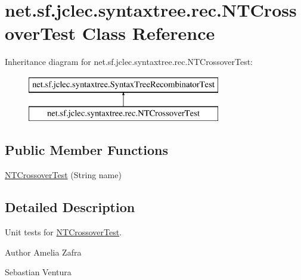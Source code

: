 \hypertarget{classnet_1_1sf_1_1jclec_1_1syntaxtree_1_1rec_1_1_n_t_crossover_test}{\section{net.\-sf.\-jclec.\-syntaxtree.\-rec.\-N\-T\-Crossover\-Test Class Reference}
\label{classnet_1_1sf_1_1jclec_1_1syntaxtree_1_1rec_1_1_n_t_crossover_test}
}
Inheritance diagram for net.\-sf.\-jclec.\-syntaxtree.\-rec.\-N\-T\-Crossover\-Test\-:\begin{figure}[H]
\begin{center}
\leavevmode
\includegraphics[height=2.000000cm]{classnet_1_1sf_1_1jclec_1_1syntaxtree_1_1rec_1_1_n_t_crossover_test}
\end{center}
\end{figure}
\subsection*{Public Member Functions}
\begin{DoxyCompactItemize}
\item 
\hyperlink{classnet_1_1sf_1_1jclec_1_1syntaxtree_1_1rec_1_1_n_t_crossover_test_ab1db0d79a45bce456fb3a65db95493ec}{N\-T\-Crossover\-Test} (String name)
\end{DoxyCompactItemize}


\subsection{Detailed Description}
Unit tests for \hyperlink{classnet_1_1sf_1_1jclec_1_1syntaxtree_1_1rec_1_1_n_t_crossover_test}{N\-T\-Crossover\-Test}.

\begin{DoxyAuthor}{Author}
Amelia Zafra 

Sebastian Ventura 
\end{DoxyAuthor}


